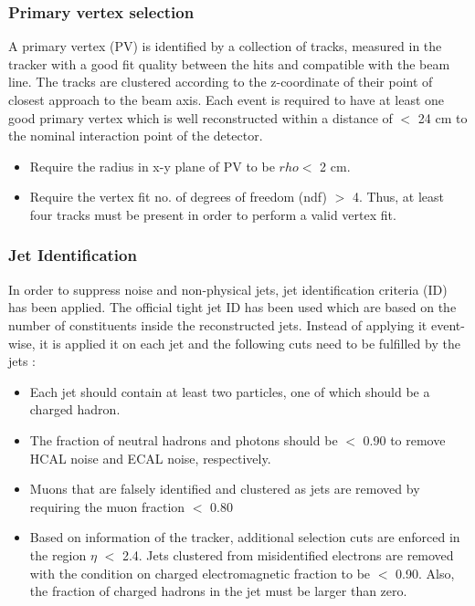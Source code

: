 \subsubsection{Primary vertex selection}
A primary vertex (PV) is identified by a collection of tracks, measured 
in the tracker with a good fit quality between the hits and 
compatible with the beam line. The tracks are clustered according to the z-coordinate of 
their point of closest approach to the beam axis. Each event 
is required to have at least one good primary vertex which is well 
reconstructed within a distance of  $<$ 24 cm to the nominal 
interaction point of the detector.

\begin{itemize}
\item Require the radius in x-y plane of PV to be $rho <$ 2 cm.
\item Require the vertex fit no. of degrees of freedom (ndf) $>$ 4. Thus, at least four tracks must be present in order to perform a valid 
  vertex fit.
\end{itemize}

\subsubsection{Jet Identification}
In order to suppress noise and non-physical jets, jet identification criteria (ID) has been applied. The official tight jet ID has been used which are based on the number of constituents inside the reconstructed jets. Instead of applying it event-wise, it 
is applied it on each jet and the following cuts need to be fulfilled by the jets :

\begin{itemize}
\item Each jet should contain at least two particles, one of which should be a charged hadron.
\item The fraction of neutral hadrons and photons should be $<$ 0.90 to remove HCAL noise and ECAL
  noise, respectively. 
\item Muons that are falsely identified and clustered as jets are removed by requiring the muon fraction $<$ 0.80 
\item Based on information of the tracker, additional selection cuts are enforced in the region $\eta$ $<$ 2.4. Jets clustered from 
  misidentified electrons are removed with the condition on charged electromagnetic fraction to be $<$ 0.90. Also, the fraction of charged 
  hadrons in the jet must be larger than zero. 
\end{itemize}

